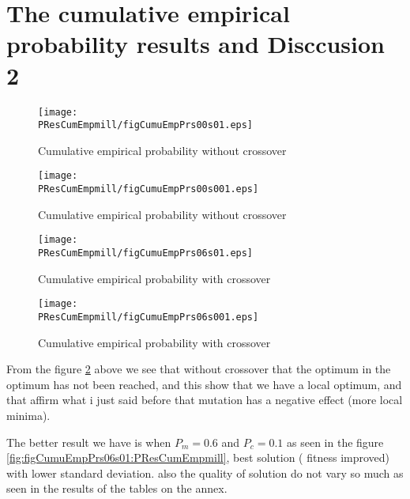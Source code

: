 \section{The cumulative empirical probability results and Disccusion 2}

\begin{figure}[H]
	\begin{minipage}[t]{0.5\linewidth}
		\texttt{[image: \\PResCumEmpmill/figCumuEmpPrs00s01.eps]}
		\caption{Cumulative empirical probability without crossover }
		\label{fig:figCumuEmpPrs00s01:PResCumEmpmill}
	\end{minipage}
	\hspace{2mm}
	\begin{minipage}[t]{0.5\linewidth}
	\texttt{[image: \\PResCumEmpmill/figCumuEmpPrs00s001.eps]}
	\caption{Cumulative empirical probability without crossover}
	\label{fig:figCumuEmpPrs00s001:PResCumEmpmill}
	\end{minipage}
\end{figure}


\begin{figure}[H]
	\begin{minipage}[t]{0.5\linewidth}
		\texttt{[image: \\PResCumEmpmill/figCumuEmpPrs06s01.eps]}
		\caption{Cumulative empirical probability with crossover}
		\label{fig:figCumuEmpPrs06s01:PResCumEmpmill}
	\end{minipage}
	\hspace{2mm}
	\begin{minipage}[t]{0.5\linewidth}
	\texttt{[image: \\PResCumEmpmill/figCumuEmpPrs06s001.eps]}
	\caption{Cumulative empirical probability with crossover}
	\label{fig:figCumuEmpPrs06s001:PResCumEmpmill}
	\end{minipage}
\end{figure}

From the figure \ref{fig:figCumuEmpPrs06s001:PResCumEmpmill} above we see that without crossover that the optimum in the optimum has not been reached, and this show that we have a local optimum, and that affirm what i just said before that mutation has a negative effect (more local minima).

The better result we have is when $ P_m = 0.6 $ and $ P_c=0.1 $ as seen in the figure \ref{fig:figCumuEmpPrs06s01:PResCumEmpmill}, best solution ( fitness improved) with lower standard deviation. also the quality of solution do not vary so much as seen in the results of the tables on the annex.


